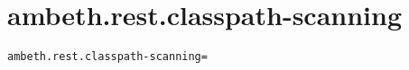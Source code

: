\section{ambeth.rest.classpath-scanning}
\label{configuration:AmbethRestClasspathScanning}
\ClearAPI
\TODO%
\begin{lstlisting}[style=Props,caption={Usage example for \textit{ambeth.rest.classpath-scanning}}]
ambeth.rest.classpath-scanning=
\end{lstlisting}